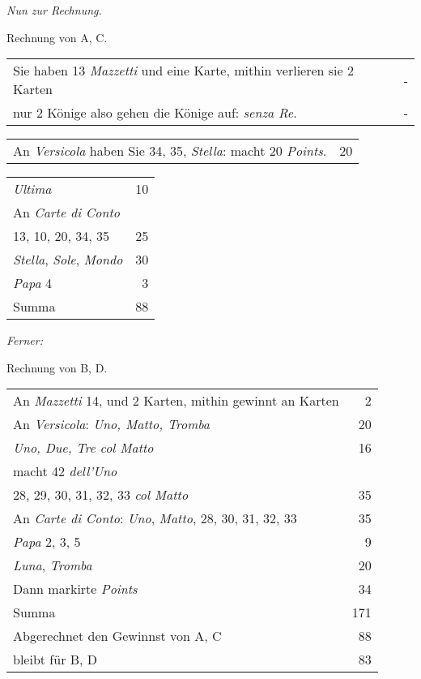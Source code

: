 \documentclass[11pt,a6paper,twoside]{article}
\begin{document}
{\kern4pt \centering\itshape Nun zur Rechnung.\\\kern 3pt}

Rechnung von A, C.\\
\begin{tabular}{@{}b{6.5cm}@{\hspace{2em}}r}
Sie haben 13 \textit{Mazzetti} und eine Karte, mithin verlieren sie 2 Karten&-\\
nur 2 Könige also gehen die Könige auf: \textit{senza Re}.&-\\
\end{tabular}
\begin{tabular}{@{}b{6.5cm}r}
An \textit{Versicola} haben Sie
34, 35, \textit{Stella}: macht 20 \textit{Points}.& 20\\
\end{tabular}
\begin{tabular}{@{}b{6.5cm}r}
\textit{Ultima}& 10\\
An \textit{Carte di Conto}\\
13, 10, 20, 34, 35& 25\\
\textit{Stella}, \textit{Sole}, \textit{Mondo} & 30\\
\textit{Papa} 4 &3 \\
Summa &88
\end{tabular}

{\kern4pt \centering\itshape {Ferner:}\\\kern 3pt}

Rechnung von B, D.\\
\begin{tabular}{@{}b{6.5cm}r}
An \textit{Mazzetti} 14, und 2 Karten,
mithin gewinnt an Karten & 2\\
An \textit{Versicola}:
\textit{Uno, Matto, Tromba}& 20\\
\textit{Uno, Due, Tre col Matto}& 16\\
macht 42 \textit{dell'Uno}\\
28, 29, 30, 31, 32, 33 \textit{col Matto}& 35\\
An \textit{Carte di Conto}:
\textit{Uno}, \textit{Matto}, 28, 30, 31, 32, 33& 35\\
\textit{Papa} 2, 3, 5& 9\\
\textit{Luna}, \textit{Tromba}& 20\\
Dann markirte \textit{Points}& 34\\
Summa \dotfill& 171\\
  Abgerechnet den Gewinnst von A, C &88\\
bleibt für B, D &83\\
\end{tabular}
\end{document}
